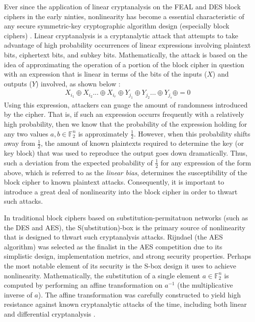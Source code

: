 \documentclass[11pt]{article}
\newcommand{\field}[1]{\mathbb{#1}} %
\begin{document}
Ever since the application of linear cryptanalysis on the FEAL and DES block ciphers in the early ninties, nonlinearity has become a essential characteristic of any secure symmetric-key cryptographic algorithm design (especially block ciphers) \cite{Heys01atutorial}. Linear cryptanalysis is a cryptanalytic attack that attempts to take advantage of high probability occurrences of linear expressions involving plaintext bits, ciphertext bits, and subkey bits. Mathematically, the attack is based on the idea of approximating the operation of a portion of the block cipher in question with an expression that is linear in terms of the bits of the inputs ($X$) and outputs ($Y$) involved, as shown below \cite{Heys01atutorial}:
\begin{eqnarray*}
X_{i_{1}} \oplus X_{i_{2}} ... \oplus X_{i_{r}} \oplus Y_{j_{1}} \oplus Y_{j_{2}} ... \oplus Y_{j_{s}} \oplus  = 0
\end{eqnarray*}
Using this expression, attackers can guage the amount of randomness introduced by the cipher. That is, if such an expression occurrs frequently with a relatively high probability, then we know that the probability of the expression holding for any two values $a,b\in \field{F}_2^n$ is approximately $\frac{1}{2}$. However, when this probability shifts away from $\frac{1}{2}$, the amount of known plaintexts required to determine the key (or key block) that was used to reproduce the output goes down dramatically. Thus, such a deviation from the expected probability of $\frac{1}{2}$ for any expression of the form above, which is referred to as the \emph{linear bias}, determines the susceptibility of the block cipher to known plaintext attacks. Consequently, it is important to introduce a great deal of nonlinearity into the block cipher in order to thwart such attacks.

In traditional block ciphers based on substitution-permitatuon networks (such as the DES and AES), the S(ubstitution)-box is the primary source of nonlinearity that is designed to thwart such cryptanalysis attacks. Rijndael (the AES algorithm) was selected as the finalist in the AES competition due to its simplistic design, implementation metrics, and strong security properties. Perhaps the most notable element of its security is the S-box design it uses to achieve nonlinearity. Mathematically, the substitution of a single element $a \in  \field{F}_2^n$ is computed by performing an affine transformation on $a^{-1}$ (the multiplicative inverse of $a$). The affine transformation was carefully constructed to yield high resistance against known cryptanalytic attacks of the time, including both linear and differential cryptanalysis \cite{Daemen:2002:DRA}. 
\end{document}

